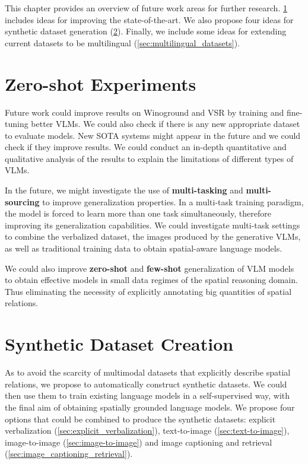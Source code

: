 This chapter provides an overview of future work areas for further research. \cref{sec:zero_shot} includes ideas for improving the state-of-the-art. We also propose four ideas for synthetic dataset generation (\cref{sec:synthetic_dataset}). Finally, we include some ideas for extending current datasets to be multilingual (\cref{sec:multilingual_datasets}).

\section{Zero-shot Experiments} \label{sec:zero_shot}

Future work could improve results on Winoground and VSR by training and fine-tuning better VLMs. We could also check if there is any new appropriate dataset to evaluate models. New SOTA systems might appear in the future and we could check if they improve results. We could conduct an in-depth quantitative and qualitative analysis of the results to explain the limitations of different types of VLMs.

In the future, we might investigate the use of \textbf{multi-tasking} and \textbf{multi-sourcing} to improve generalization properties. In a multi-task training paradigm, the model is forced to learn more than one task simultaneously, therefore improving its generalization capabilities. We could investigate multi-task settings to combine the verbalized dataset, the images produced by the generative VLMs, as well as traditional training data to obtain spatial-aware language models.

We could also improve \textbf{zero-shot} and \textbf{few-shot} generalization of VLM models to obtain effective models in small data regimes of the spatial reasoning domain. Thus eliminating the necessity of explicitly annotating big quantities of spatial relations.

\section{Synthetic Dataset Creation} \label{sec:synthetic_dataset}

As to avoid the scarcity of multimodal datasets that explicitly describe spatial relations, we propose to automatically construct synthetic datasets. We could then use them to train existing language models in a self-supervised way, with the final aim of obtaining spatially grounded language models. We propose four options that could be combined to produce the synthetic datasets: explicit verbalization (\ref{sec:explicit_verbalization}), text-to-image (\ref{sec:text-to-image}), image-to-image (\ref{sec:image-to-image}) and image captioning and retrieval (\ref{sec:image_captioning_retrieval}).

